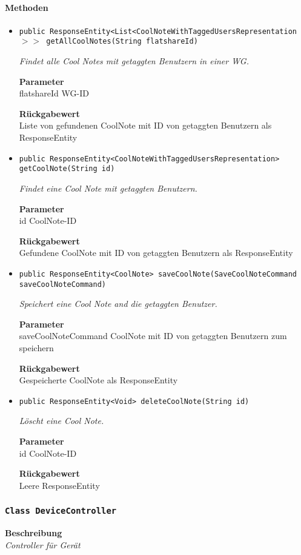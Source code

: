     \paragraph*{Methoden}
    \begin{itemize}
    	\item{\texttt{public ResponseEntity<List<CoolNoteWithTaggedUsersRepresentation$>>$ getAllCoolNotes(String flatshareId)}}
    	
    	\textit{Findet alle Cool Notes mit getaggten Benutzern in einer WG.}
    	
    	\textbf{Parameter} \\
    	flatshareId WG-ID
    	
    	\textbf{Rückgabewert} \\
    	Liste von gefundenen CoolNote mit ID von getaggten Benutzern als ResponseEntity        \item{\texttt{public ResponseEntity<CoolNoteWithTaggedUsersRepresentation> getCoolNote(String id)}}
    	
    	\textit{Findet eine Cool Note mit getaggten Benutzern.}
    	
    	\textbf{Parameter} \\
    	id CoolNote-ID
    	
    	\textbf{Rückgabewert} \\
    	Gefundene CoolNote mit ID von getaggten Benutzern als ResponseEntity        \item{\texttt{public ResponseEntity<CoolNote> saveCoolNote(SaveCoolNoteCommand saveCoolNoteCommand)}}
    	
    	\textit{Speichert eine Cool Note and die getaggten Benutzer.}
    	
    	\textbf{Parameter} \\
    	saveCoolNoteCommand CoolNote mit ID von getaggten Benutzern zum speichern
    	
    	\textbf{Rückgabewert} \\
    	Gespeicherte CoolNote als ResponseEntity        \item{\texttt{public ResponseEntity<Void> deleteCoolNote(String id)}}
    	
    	\textit{Löscht eine Cool Note.}
    	
    	\textbf{Parameter} \\
    	id CoolNote-ID
    	
    	\textbf{Rückgabewert} \\
    	Leere ResponseEntity
    \end{itemize}
    \subsubsection{\texttt{Class DeviceController}}
    \textbf{Beschreibung} \\
    \textit{Controller für Gerät}
